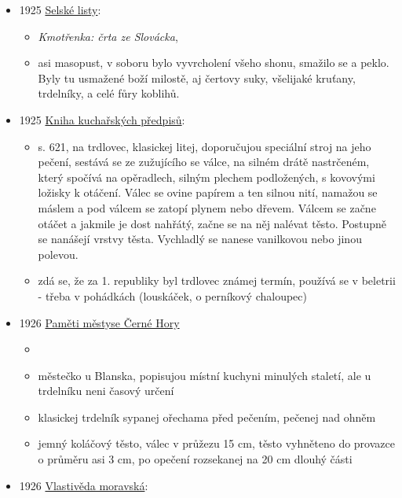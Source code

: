 \begin{itemize}
  \begin{itemize}
  \tightlist
  \item
    Jak to bude vypadat, až v Československé republice nastoupí vláda
    sovětů
  \item
    popisujou hypotetickej Centrosklad, kam se budou dovážet trakaře,
    syrečky, klobásy, hrábě, kvedlačky, slivovice, trdelníky a jiné
  \end{itemize}
\item
  1925
  \href{https://www.digitalniknihovna.cz/vkol/uuid/uuid:06c09fd2-48fa-4e3d-9b90-2a1cdd6eeab3}{Selské
  listy}:

  \begin{itemize}
  \tightlist
  \item
    \emph{Kmotřenka: črta ze Slovácka}, 
  \item
    asi masopust, v soboru bylo vyvrcholení všeho shonu, smažilo se a
    peklo. Byly tu usmažené boží milostě, aj čertovy suky, všelijaké
    kruťany, trdelníky, a celé fůry koblihů.
  \end{itemize}
\item
  1925
  \href{https://ndk.cz/uuid/uuid:fc3b3470-0163-11ea-af21-005056827e52}{Kniha
  kuchařských předpisů}:

  \begin{itemize}
  \tightlist
  \item
    s. 621,  na trdlovec, klasickej litej, doporučujou
    speciální stroj na jeho pečení, sestává se ze zužujícího se válce,
    na silném drátě nastrčeném, který spočívá na opěradlech, silným
    plechem podložených, s kovovými ložisky k otáčení. Válec se ovine
    papírem a ten silnou nití, namažou se máslem a pod válcem se zatopí
    plynem nebo dřevem. Válcem se začne otáčet a jakmile je dost
    nahřátý, začne se na něj nalévat těsto. Postupně se nanášejí vrstvy
    těsta. Vychladlý se nanese vanilkovou nebo jinou polevou.
  \item
    zdá se, že za 1. republiky byl trdlovec známej termín, používá se v
    beletrii - třeba v pohádkách (louskáček, o perníkový chaloupec)
  \end{itemize}
\item
  1926
  \href{https://ndk.cz/view/uuid:be635380-b1b9-11ed-826c-005056827e52?page=uuid\%3A9ae6ef00-82cb-438b-8727-ef820bed7a49}{Paměti
  městyse Černé Hory}

  \begin{itemize}
  \tightlist
  \item
  \item
    městečko u Blanska, popisujou místní kuchyni minulých staletí, ale u
    trdelníku neni časový určení
  \item
    klasickej trdelník sypanej ořechama před pečením, pečenej nad ohněm
  \item
    jemný koláčový těsto, válec v průžezu 15 cm, těsto vyhněteno do
    provazce o průměru asi 3 cm, po opečení rozsekanej na 20 cm dlouhý
    části
  \end{itemize}
\item
  1926
  \href{https://www.digitalniknihovna.cz/mzk/uuid/uuid:3ffb22b9-dde8-4a93-b4f9-7eb3f9242f73}{Vlastivěda
  moravská}:


\end{itemize}
